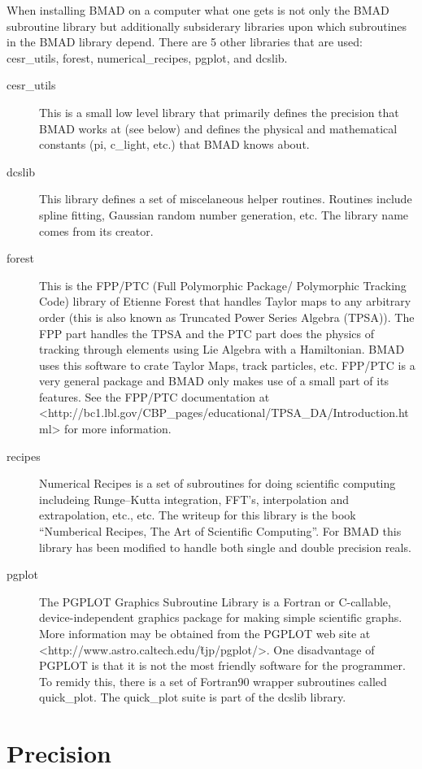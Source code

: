 \documentclass{book}
\begin{document}
When installing BMAD on a computer what one gets is not only the BMAD
subroutine library but additionally subsiderary libraries upon which
subroutines in the BMAD library depend. There are 5 other libraries
that are used: cesr\_utils, forest, numerical_recipes, pgplot, and dcslib.
\begin{description}
\item[cesr\_utils] This is a small low level library that primarily defines 
the precision that BMAD works at (see below) and defines the physical
and mathematical constants (pi, c_light, etc.) that BMAD knows
about.
\item[dcslib] This library defines a set of miscelaneous helper routines. 
Routines include spline fitting, Gaussian random number generation,
etc. The library name comes from its creator.
\item[forest] This is the FPP/PTC 
(Full Polymorphic Package/ Polymorphic Tracking Code) library of
Etienne Forest that handles Taylor maps to any arbitrary order (this
is also known as Truncated Power Series Algebra (TPSA)). The FPP part
handles the TPSA and the PTC part does the physics of tracking through
elements using Lie Algebra with a Hamiltonian.  BMAD uses this
software to crate Taylor Maps, track particles, etc.  FPP/PTC is a
very general package and BMAD only makes use of a small part of its
features. See the FPP/PTC documentation at
<http://bc1.lbl.gov/CBP\_pages/educational/TPSA\_DA/Introduction.html>
for more information.
\item[recipes] Numerical Recipes is a set of subroutines for doing 
scientific computing includeing Runge--Kutta integration, FFT's,
interpolation and extrapolation, etc., etc. The writeup for this
library is the book ``Numberical Recipes, The Art of Scientific
Computing''\cite{?}. For BMAD this library has been modified to handle
both single and double precision reals.
\item[pgplot] The PGPLOT Graphics Subroutine Library is a Fortran or 
C-callable, device-independent graphics package for making simple
scientific graphs. More information may be obtained from the PGPLOT
web site at <http://www.astro.caltech.edu/\~tjp/pgplot/>. One
disadvantage of PGPLOT is that it is not the most friendly software
for the programmer. To remidy this, there is a set of Fortran90
wrapper subroutines called quick\_plot. The quick\_plot suite is part
of the dcslib library.
\end{description}

\section{Precision}
\end{document}

